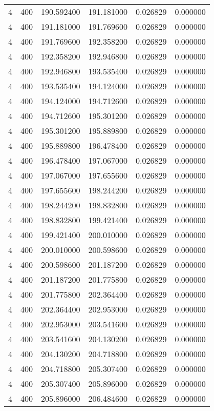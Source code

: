 \begin{longtable}{rrrrrr}
4 & 400 & 190.592400 & 191.181000 & 0.026829 & 0.000000 \\
4 & 400 & 191.181000 & 191.769600 & 0.026829 & 0.000000 \\
4 & 400 & 191.769600 & 192.358200 & 0.026829 & 0.000000 \\
4 & 400 & 192.358200 & 192.946800 & 0.026829 & 0.000000 \\
4 & 400 & 192.946800 & 193.535400 & 0.026829 & 0.000000 \\
4 & 400 & 193.535400 & 194.124000 & 0.026829 & 0.000000 \\
4 & 400 & 194.124000 & 194.712600 & 0.026829 & 0.000000 \\
4 & 400 & 194.712600 & 195.301200 & 0.026829 & 0.000000 \\
4 & 400 & 195.301200 & 195.889800 & 0.026829 & 0.000000 \\
4 & 400 & 195.889800 & 196.478400 & 0.026829 & 0.000000 \\
4 & 400 & 196.478400 & 197.067000 & 0.026829 & 0.000000 \\
4 & 400 & 197.067000 & 197.655600 & 0.026829 & 0.000000 \\
4 & 400 & 197.655600 & 198.244200 & 0.026829 & 0.000000 \\
4 & 400 & 198.244200 & 198.832800 & 0.026829 & 0.000000 \\
4 & 400 & 198.832800 & 199.421400 & 0.026829 & 0.000000 \\
4 & 400 & 199.421400 & 200.010000 & 0.026829 & 0.000000 \\
4 & 400 & 200.010000 & 200.598600 & 0.026829 & 0.000000 \\
4 & 400 & 200.598600 & 201.187200 & 0.026829 & 0.000000 \\
4 & 400 & 201.187200 & 201.775800 & 0.026829 & 0.000000 \\
4 & 400 & 201.775800 & 202.364400 & 0.026829 & 0.000000 \\
4 & 400 & 202.364400 & 202.953000 & 0.026829 & 0.000000 \\
4 & 400 & 202.953000 & 203.541600 & 0.026829 & 0.000000 \\
4 & 400 & 203.541600 & 204.130200 & 0.026829 & 0.000000 \\
4 & 400 & 204.130200 & 204.718800 & 0.026829 & 0.000000 \\
4 & 400 & 204.718800 & 205.307400 & 0.026829 & 0.000000 \\
4 & 400 & 205.307400 & 205.896000 & 0.026829 & 0.000000 \\
4 & 400 & 205.896000 & 206.484600 & 0.026829 & 0.000000 \\

\end{longtable}
